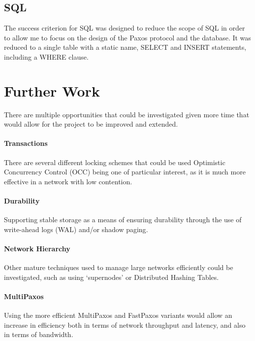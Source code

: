 \documentclass[12pt,twoside,notitlepage]{report}
\begin{document}
\subsection{SQL}

The success criterion for SQL was designed to reduce the scope of SQL in order to allow me to
focus on the design of the Paxos protocol and the database. It was reduced to a single table with
a static name, SELECT and INSERT statements, including a WHERE clause.

\section{Further Work}

There are multiple opportunities that could be investigated given more time that would allow for
the project to be improved and extended.

\paragraph{Transactions}

There are several different locking schemes that could be used Optimistic Concurrency Control
(OCC) being one of particular interest, as it is much more effective in a network with low
contention.

\paragraph{Durability}

Supporting stable storage as a means of ensuring durability through the use of write-ahead logs
(WAL)\cite{burrows06} and/or shadow paging\cite{hitz94}.

\paragraph{Network Hierarchy}

Other mature techniques used to manage large networks efficiently could be investigated, such as
using `supernodes' or Distributed Hashing Tables.

\paragraph{MultiPaxos}

Using the more efficient MultiPaxos and FastPaxos variants would allow an
increase in efficiency both in terms of network throughput and latency, and also in terms of
bandwidth.
\end{document}
